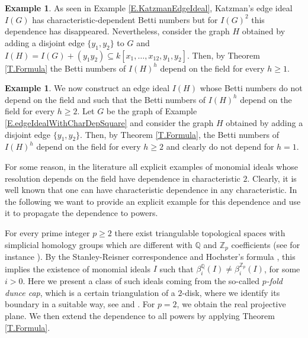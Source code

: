 \documentclass[11pt,oneside]{amsart}
\theoremstyle{plain}
\theoremstyle{definition}
\newtheorem{example}[theorem]{Example}
\newcommand{\Q}{\mathbb{Q}}
\newcommand{\Z}{\mathbb{Z}}
\begin{document}
\begin{example}
As seen in Example \ref{E.KatzmanEdgeIdeal}, Katzman's edge ideal $I(G)$ has characteristic-dependent Betti numbers but for $I(G)^2$ this dependence has disappeared.  Nevertheless, consider the graph $H$ obtained by adding a disjoint edge $\{y_1,y_2\}$ to $G$ and $I(H) = I(G) + (y_1y_2) \subseteq k[x_1,\dots,x_{12},y_1,y_2]$. Then, by Theorem \ref{T.Formula} the Betti numbers of $I(H)^h$ depend on the field for every $h \geq 1$. 
\end{example}


\begin{example}\label{E.nonDepEdgeIdealWithCharDepPowers}
We now construct an edge ideal $I(H)$ whose Betti numbers do not depend on the field and such that the Betti numbers of $I(H)^h$ depend on the field for every $h \geq 2$. Let $G$ be the graph of Example \ref{E.edgeIdealWithCharDepSquare} and consider the graph $H$ obtained by adding a disjoint edge $\{y_1,y_2\}$. Then, by Theorem \ref{T.Formula}, the Betti numbers of $I(H)^h$ depend on the field for every $h \geq 2$ and clearly do not depend for $h=1$.
\end{example}


For some reason, in the literature all explicit examples of monomial ideals whose resolution depends on the field have dependence in characteristic $2$. Clearly, it is well known that one can have
characteristic dependence in any characteristic. In the following we 
want to provide an explicit example for this dependence and use it
to propagate the dependence to powers. 

For every prime integer $p \geq 2$ there exist triangulable topological spaces with simplicial homology groups which are different with $\Q$ and $\Z_p$ coefficients (see for instance \cite[Theorem 40.9]{M84}). By the Stanley-Reisner correspondence and Hochster's formula \cite{H77}, this implies the existence of monomial ideals $I$ such that $\beta_i^{\Q}(I) \neq \beta_i^{\Z_p}(I)$, for some $i>0$. Here we present a class of such ideals coming from the so-called \textit{$p$-fold dunce cap}, which is a certain triangulation of a $2$-disk, where we identify its boundary in a suitable way, see \cite[Exercise 6, p.~41]{M84} and \cite[Example 5.11]{SW11}. For $p=2$, we obtain the real projective plane. We then extend the dependence to all powers by applying Theorem \ref{T.Formula}.
\end{document}
